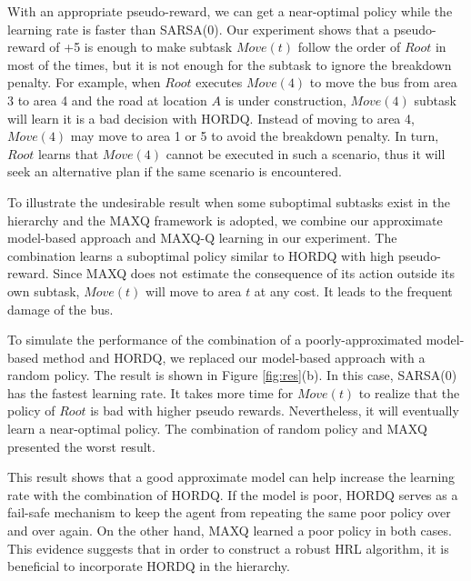 With an appropriate pseudo-reward, we can get a near-optimal policy
while the learning rate is faster than SARSA(0).
Our experiment shows that a pseudo-reward of +5 is enough to make subtask $Move(t)$ follow 
the order of $Root$ in most of the times, but it is not enough for the subtask to ignore
the breakdown penalty. For example, when $Root$ executes $Move(4)$ to move the bus from area 
3 to area 4 and the road at location $A$ is under construction, $Move(4)$ subtask
will learn it is a bad decision with HORDQ.
Instead of moving to area 4, $Move(4)$ may move to area 1 or 5 to avoid
the breakdown penalty. In turn, $Root$ learns that $Move(4)$ cannot be executed in 
such a scenario, thus it will seek an alternative plan if the same scenario
is encountered.

To illustrate the undesirable result when some suboptimal subtasks exist in 
the hierarchy and the MAXQ framework is adopted, we combine our approximate model-based approach
and MAXQ-Q learning in our experiment. The combination learns a suboptimal policy similar to HORDQ with high pseudo-reward. 
Since MAXQ does not estimate the consequence of its action outside its own subtask,
$Move(t)$ will move to area $t$ at any cost. It leads to the frequent damage of the bus.

To simulate the performance of the combination of a poorly-approximated model-based method and 
HORDQ, we replaced our model-based approach with a random policy.
The result is shown in Figure \ref{fig:res}(b). In this case, SARSA(0) has the fastest
learning rate. It takes more time for $Move(t)$ to realize that the policy of $Root$ is bad with higher pseudo rewards.
Nevertheless, it will eventually learn a near-optimal policy.
The combination of random policy and MAXQ presented the worst result.

This result shows that a good approximate model 
can help increase the learning rate with the combination of HORDQ. 
If the model is poor, HORDQ serves as a fail-safe mechanism to keep 
the agent from repeating the same poor policy over and over again.
On the other hand, MAXQ learned a poor policy in both cases.  
This evidence suggests that in order to construct a robust HRL 
algorithm, it is beneficial to incorporate HORDQ in the hierarchy.

